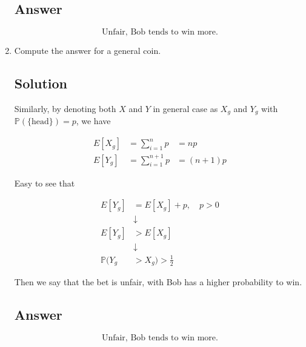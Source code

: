 \documentclass[12pt]{article}
\newcommand{\bP}{\mathbb{P}}
\begin{document}
\begin{enumerate}[start=1,label={\bfseries Part \arabic*:},leftmargin=0in]
		\subsection*{Answer}
		
			\[\boxed{\text{Unfair, Bob tends to win more.}}\]
		
		\bigskip\item Compute the answer for a general coin.
		
		\subsection*{Solution}
		
			Similarly, by denoting both $X$ and $Y$ in general case as $X_g$ and $Y_g$ with $\bP(\{\text{head}\}) = p$, we have
			
			\[
			\begin{aligned}
				E[X_g] &= \sum_{i=1}^np &= np\\
				E[Y_g] &= \sum_{i=1}^{n+1}p &= (n+1)p
			\end{aligned}
			\]
			
			Easy to see that
			
			\[
			\begin{aligned}
				E[Y_g] &= E[X_g] + p,\quad p > 0\\
				&\downarrow\\
				E[Y_g] &> E[X_g]\\
				&\downarrow\\
				\bP(Y_g & > X_g) > \frac{1}{2}
			\end{aligned}
			\]
			
			Then we say that the bet is unfair, with Bob has a higher probability to win.
		
		\subsection*{Answer}
		
			\[\boxed{\text{Unfair, Bob tends to win more.}}\]
	\end{enumerate}
	
\end{document}
